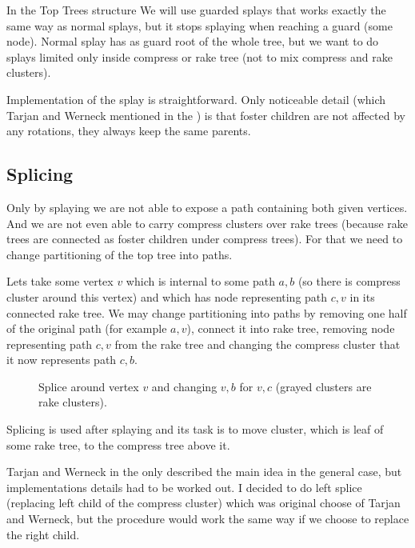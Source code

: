 In the Top Trees structure We will use {\I guarded splays} that works exactly
the same way as normal splays, but it stops splaying when reaching a guard (some
node). Normal splay has as guard root of the whole tree, but we want to do
splays limited only inside compress or rake tree (not to mix compress and
rake clusters).

Implementation of the splay is straightforward. Only noticeable detail (which
Tarjan and Werneck mentioned in the \cite{SelfAdjustingTT}) is that foster
children are not affected by any rotations, they always keep the same parents.

\subsection{Splicing}

Only by splaying we are not able to expose a path containing both given
vertices. And we are not even able to carry compress clusters over rake trees
(because rake trees are connected as foster children under compress trees). For
that we need to change partitioning of the top tree into paths.

Lets take some vertex $v$ which is internal to some path $a,b$ (so there is
compress cluster around this vertex) and which has node representing path $c,v$
in its connected rake tree. We may change partitioning into paths by removing
one half of the original path (for example $a,v$), connect it into rake tree,
removing node representing path $c,v$ from the rake tree and changing the
compress cluster that it now represents path $c,b$.

\begin{figure}[h]
\centering
{}
\caption{Splice around vertex $v$ and changing $v,b$ for $v,c$ (grayed clusters
are rake clusters).}
\end{figure}

Splicing is used after splaying and its task is to move cluster, which is leaf
of some rake tree, to the compress tree above it.

Tarjan and Werneck in the \cite{SelfAdjustingTT} only described the main idea in
the general case, but implementations details had to be worked out. I decided
to do {\I left splice} (replacing left child of the compress cluster) which was
original choose of Tarjan and Werneck, but the procedure would work the same
way if we choose to replace the right child.

